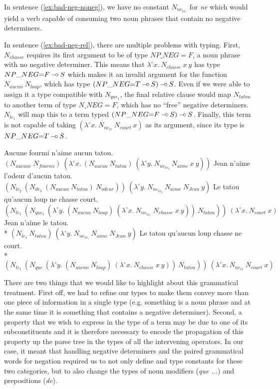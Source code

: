 In sentence (\ref{ex:bad-neg-noneg}), we have no constant
$N_{ne_{tv_?}}$ for \emph{ne} which would yield a verb capable of
consuming two noun phrases that contain no negative determiners.

In sentence (\ref{ex:bad-neg-rel}), there are multiple problems with
typing. First, $N_{chasse}$ requires its first argument to be of type
$NP\_NEG{=}F$, a noun phrase with no negative determiner. This means
that $\lambda^{\circ} x.\ N_{chasse}\ x\ y$ has type $NP\_NEG{=}F \mathbin{{-}\mkern-3.5mu{\circ}}
S$ which makes it an invalid argument for the function
$N_{aucun}\ N_{loup}$, which has type $(NP\_NEG{=}T \mathbin{{-}\mkern-3.5mu{\circ}} S) \mathbin{{-}\mkern-3.5mu{\circ}}
S$. Even if we were able to assign it a type compatible with
$N_{que_1}$, the final relative clause would map $N_{tatou}$ to another
term of type $N\_NEG{=}F$, which has no ``free'' negative
determiners. $N_{le_1}$ will map this to a term typed $(NP\_NEG{=}F
\mathbin{{-}\mkern-3.5mu{\circ}} S) \mathbin{{-}\mkern-3.5mu{\circ}} S$. Finally, this term is not capable of taking
$(\lambda^{\circ} x.\ N_{ne_{iv}}\ N_{court}\ x)$ as its argument, since
its type is $NP\_NEG{=}T \mathbin{{-}\mkern-3.5mu{\circ}} S$.

\begin{exe}
  \ex \label{ex:good-neg-double} Aucune fourmi n'aime aucun tatou. \\
      $(N_{aucune}\ N_{fourmi})\ (\lambda^{\circ} x.\ (N_{aucun}\ N_{tatou})\ (\lambda^{\circ} y.\ N_{ne_{tv_3}}\ N_{aime}\ x\ y))$
  \ex \label{ex:good-neg-embed} Jean n'aime l'odeur d'aucun tatou. \\
      $(N_{le_2}\ (N_{de_3}\ (N_{aucun}\ N_{tatou})\ N_{odeur}))\ (\lambda^{\circ} y.\ N_{ne_{tv_2}}\ N_{aime}\ N_{Jean}\ y)$
  \ex \label{ex:good-neg-rel} Le tatou qu'aucun loup ne chasse court. \\
      $(N_{le_1}\ (N_{que_1}\ (\lambda^{\circ} y.\ (N_{aucun}\ N_{loup})\ (\lambda^{\circ} x.\ N_{ne_{tv_1}}\ N_{chasse}\ x\ y))\ N_{tatou}))\ (\lambda^{\circ} x.\ N_{court}\ x)$
  \ex * \label{ex:bad-neg-noneg} Jean n'aime le tatou. \\
      * $(N_{le_1}\ N_{tatou})\ (\lambda^{\circ} y.\ N_{ne_{tv_?}}\ N_{aime}\ N_{Jean}\ y)$
  \ex * \label{ex:bad-neg-rel} Le tatou qu'aucun loup chasse ne court. \\
      * $(N_{le_1}\ (N_{que}\ (\lambda^{\circ} y.\ (N_{aucun}\ N_{loup})\ (\lambda^{\circ} x.\ N_{chasse}\ x\ y))\ N_{tatou}))\ (\lambda^{\circ} x.\ N_{ne_{iv}}\ N_{court}\ x)$
\end{exe}

There are two things that we would like to highlight about this
grammatical treatment. First off, we had to refine our types to make
them convey more than one piece of information in a single type
(e.g. something is a noun phrase and at the same time it is something
that contains a negative determiner). Second, a property that we wish to
express in the type of a term may be due to one of its subconstituents
and it is therefore necessary to encode the propagation of this property
up the parse tree in the types of all the intervening operators. In our
case, it meant that handling negative determiners and the paired
grammatical words for negation required us to not only define and type
constants for these two categories, but to also change the types of noun
modifiers (\emph{que ...}) and prepositions (\emph{de}).


